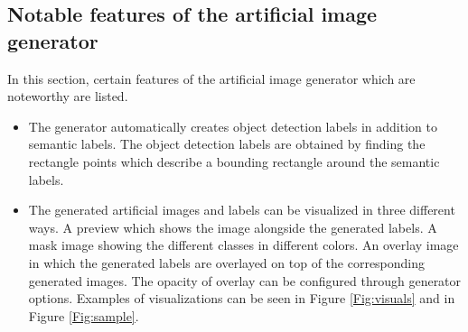	
\subsection{Notable features of the artificial image generator}

In this section, certain features of the artificial image generator which are noteworthy are listed.
	\begin{itemize}
		\item The generator automatically creates object detection labels in addition to semantic labels. The object detection labels are obtained by finding the rectangle points which describe a bounding rectangle around the semantic labels.
		\item The generated artificial images and labels can be visualized in three different ways. A preview which shows the image alongside the generated labels. A mask image showing the different classes in different colors. An overlay image in which the generated labels are overlayed on top of the corresponding generated images. The opacity of overlay can be configured through generator options. Examples of visualizations can be seen in Figure \ref{Fig:visuals} and in Figure \ref{Fig:sample}.
		

\end{itemize}

